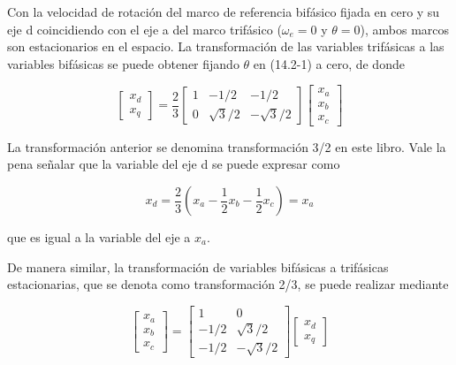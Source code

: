 \documentclass[letterpaper,12pt]{article}
\begin{document}
Con la velocidad de rotación del marco de referencia bifásico fijada en cero y su eje d coincidiendo con el eje a del marco trifásico ($\omega_e = 0$ y $\theta = 0$), ambos marcos son estacionarios en el espacio. La transformación de las variables trifásicas a las variables bifásicas se puede obtener fijando $\theta$ en (14.2-1) a cero, de donde

\begin{equation}
\begin{bmatrix}
x_d \\
x_q
\end{bmatrix}
=
\frac{2}{3}
\begin{bmatrix}
1 & -1/2 & -1/2 \\
0 & \sqrt{3}/2 & -\sqrt{3}/2
\end{bmatrix}
\begin{bmatrix}
x_a \\
x_b \\
x_c
\end{bmatrix} \tag{14.2-6}
\end{equation}

La transformación anterior se denomina transformación 3/2 en este libro. Vale la pena señalar que la variable del eje d se puede expresar como

\begin{equation}
x_d = \frac{2}{3} \left( x_a - \frac{1}{2}x_b - \frac{1}{2}x_c \right) = x_a \tag{14.2-7}
\end{equation}

que es igual a la variable del eje a $x_a$.

De manera similar, la transformación de variables bifásicas a trifásicas estacionarias, que se denota como transformación 2/3, se puede realizar mediante

\begin{equation}
\begin{bmatrix}
x_a \\
x_b \\
x_c
\end{bmatrix}
=
\begin{bmatrix}
1 & 0 \\
-1/2 & \sqrt{3}/2 \\
-1/2 & -\sqrt{3}/2
\end{bmatrix}
\begin{bmatrix}
x_d \\
x_q
\end{bmatrix} \tag{14.2-8}
\end{equation}
\end{document}
